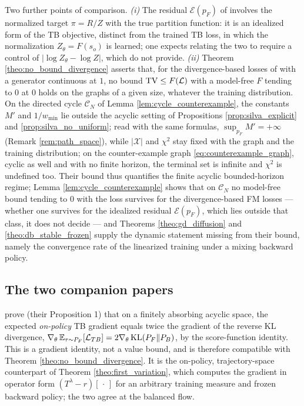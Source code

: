 \begin{remark}\label{rem:silva_vs_ours}
Two further points of comparison. \emph{(i)} The residual $\mathcal E(p_F)$ of \citet{silvageneralization} involves the normalized target $\pi = R/Z$ with the true partition function: it is an idealized form of the TB objective, distinct from the trained TB loss, in which the normalization $Z_\theta = F(s_o)$ is learned; one expects relating the two to require a control of $|\log Z_\theta - \log Z|$, which \citet{silvageneralization} do not provide. \emph{(ii)} Theorem \ref{theo:no_bound_divergence} asserts that, for the divergence-based losses of \citet{brunswic2024theory} with a generator continuous at $1$, no bound $\mathrm{TV}\leq F(\mathcal L)$ with a model-free $F$ tending to $0$ at $0$ holds on the graphs of a given size, whatever the training distribution. On the directed cycle $\mathcal C_N$ of Lemma \ref{lem:cycle_counterexample}, the constants $M'$ and $1/w_{\min}$ lie outside the acyclic setting of Propositions \ref{prop:silva_explicit} and \ref{prop:silva_no_uniform}; read with the same formulas, $\sup_{p_F}M'=+\infty$ (Remark \ref{rem:path_space}), while $|\mathcal X|$ and $\chi^2$ stay fixed with the graph and the training distribution; on the counter-example graph \eqref{eq:counterexample_graph}, cyclic as well and with no finite horizon, the terminal set is infinite and $\chi^2$ is undefined too. Their bound thus quantifies the finite acyclic bounded-horizon regime; Lemma \ref{lem:cycle_counterexample} shows that on $\mathcal C_N$ no model-free bound tending to $0$ with the loss survives for the divergence-based FM losses --- whether one survives for the idealized residual $\mathcal E(p_F)$, which lies outside that class, it does not decide --- and Theorems \ref{theo:gd_diffusion} and \ref{theo:db_stable_frozen} supply the dynamic statement missing from their bound, namely the convergence rate of the linearized training under a mixing backward policy.
\end{remark}

\subsection{The two companion papers}

\citet{silva2024divergence} prove (their Proposition 1) that on a finitely absorbing acyclic space, the expected \emph{on-policy} TB gradient equals twice the gradient of the reverse KL divergence, $\nabla_\theta\,\mathbb E_{\tau\sim P_F}[\mathcal L_{TB}] = 2\nabla_\theta\,\mathrm{KL}(P_F\|P_B)$, by the score-function identity. This is a gradient identity, not a value bound, and is therefore compatible with Theorem \ref{theo:no_bound_divergence}. It is the on-policy, trajectory-space counterpart of Theorem \ref{theo:first_variation}, which computes the gradient in operator form $(T^\lambda - r)[\,\cdot\,]$ for an arbitrary training measure and frozen backward policy; the two agree at the balanced flow.

